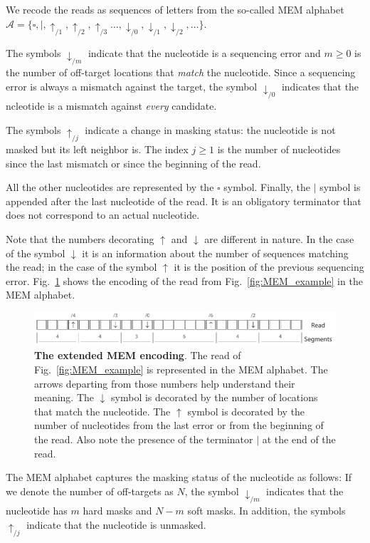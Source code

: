 \documentclass{article}
\begin{document}
We recode the reads as sequences of letters from the so-called MEM
alphabet $\mathcal{A} = \{\square, |, \uparrow_{/1}, \uparrow_{/2},
\uparrow_{/3} \ldots, \downarrow_{/0}, \downarrow_{/1}, \downarrow_{/2},
\ldots\}$.

The symbols $\downarrow_{/m}$ indicate that the nucleotide is a sequencing
error and $m \geq 0$ is the number of off-target locations that
\emph{match} the nucleotide. Since a sequencing error is always a mismatch
against the target, the symbol $\downarrow_{/0}$ indicates that the
ncleotide is a mismatch against \emph{every} candidate.

The symbols $\uparrow_{/j}$ indicate a change in masking status: the
nucleotide is not masked but its left neighbor is. The index $j \geq 1$ is
the number of nucleotides since the last mismatch or since the beginning
of the read.

All the other nucleotides are represented by the $\square$ symbol.
Finally, the $|$ symbol is appended after the last nucleotide of the read.
It is an obligatory terminator that does not correspond to an actual
nucleotide.

Note that the numbers decorating $\uparrow$ and $\downarrow$ are different
in nature. In the case of the symbol $\downarrow$ it is an information
about the number of sequences matching the read; in the case of the symbol
$\uparrow$ it is the position of the previous sequencing error.
Fig.~\ref{fig:sketch_extended} shows the encoding of the read from
Fig.~\ref{fig:MEM_example} in the MEM alphabet.

\begin{figure}[h]
\centering
\includegraphics[scale=.85]{sketch_extended.pdf}
\caption{\textbf{The extended MEM encoding}.
The read of Fig.~\ref{fig:MEM_example} is represented in the MEM alphabet.
The arrows departing from those numbers help understand their meaning. The
$\downarrow$ symbol is decorated by the number of locations that match the
nucleotide. The $\uparrow$ symbol is decorated by the number of
nucleotides from the last error or from the beginning of the read. Also
note the presence of the terminator $|$ at the end of the read.}
\label{fig:sketch_extended}
\end{figure}

The MEM alphabet captures the masking status of the nucleotide as follows:
If we denote the number of off-targets as $N$, the symbol
$\downarrow_{/m}$ indicates that the nucleotide has $m$ hard masks and
$N-m$ soft masks. In addition, the symbols $\uparrow_{/j}$ indicate that
the nucleotide is unmasked.
\end{document}
